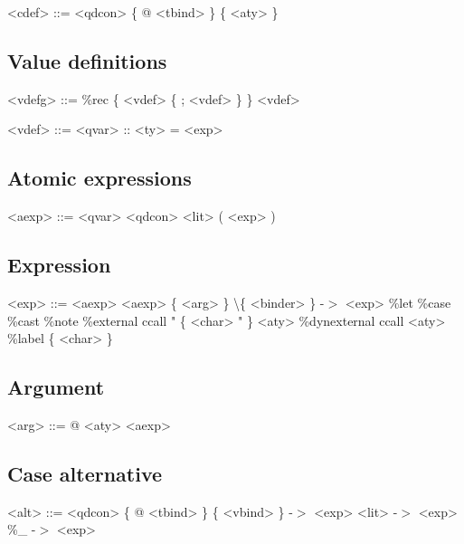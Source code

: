 \begin{grammar}
<cdef> ::= <qdcon> \{ @ <tbind> \} \{ <aty> \}
\end{grammar}

\subsection{Value definitions}

\begin{grammar}
<vdefg> ::= \%rec \{ <vdef> \{ ; <vdef> \} \}
       \alt <vdef>
\end{grammar}

\begin{grammar}
<vdef> ::= <qvar> :: <ty> = <exp>
\end{grammar}

\subsection{Atomic expressions}

\begin{grammar}
<aexp> ::= <qvar>
      \alt <qdcon>
      \alt <lit>
      \alt ( <exp> )
\end{grammar}

\subsection{Expression}

\begin{grammar}
<exp> ::= <aexp>
     \alt <aexp> \{ <arg> \}
     \alt \textbackslash \{ <binder> \} -$>$ <exp>
     \alt \%let 
     \alt \%case
     \alt \%cast
     \alt \%note
     \alt \%external ccall " \{ <char> " \} <aty>
     \alt \%dynexternal ccall <aty>
     \alt \%label \{ <char> \}
\end{grammar}

\subsection{Argument}

\begin{grammar}
<arg> ::= @ <aty>
     \alt <aexp>
\end{grammar}

\subsection{Case alternative}

\begin{grammar}
<alt> ::= <qdcon> \{ @ <tbind> \} \{ <vbind> \} -$>$ <exp>
     \alt <lit> -$>$ <exp>
     \alt \%\_ -$>$ <exp>
\end{grammar}

